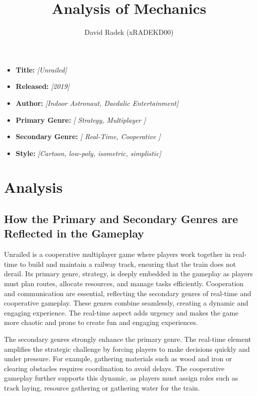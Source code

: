 \documentclass[a4paper,10pt,english]{article}
\title{%
Analysis of Mechanics%
}
\author{%
David Radek (xRADEKD00)%
}
\date{}
\newcommand{\ph}[1]{\textit{[#1]}}
\begin{document}
\maketitle
\thispagestyle{empty}

{%
\large

\begin{itemize}

\item[] \textbf{Title:} \ph{Unrailed}

\item[] \textbf{Released:} \ph{2019}

\item[] \textbf{Author:} \ph{Indoor Astronaut,  Daedalic Entertainment}

\item[] \textbf{Primary Genre:} \ph{ Strategy, Multiplayer  }

\item[] \textbf{Secondary Genre:} \ph{ Real-Time, Cooperative  }

\item[] \textbf{Style:} \ph{Cartoon, low-poly, isometric, simplistic}

\end{itemize}

}

\section*{\centering Analysis}

\subsection*{How the Primary and Secondary Genres are Reflected in the Gameplay}

Unrailed is a cooperative multiplayer game where players work together in real-time to build and maintain a railway track, ensuring that the train does not derail. Its primary genre, strategy, is deeply embedded in the gameplay as players must plan routes, allocate resources, and manage tasks efficiently. Cooperation and communication are essential, reflecting the secondary genres of real-time and cooperative gameplay. These genres combine seamlessly, creating a dynamic and engaging experience. The real-time aspect adds urgency and makes the game more chaotic and prone to create fun and engaging experiences.

The secondary genres strongly enhance the primary genre. The real-time element amplifies the strategic challenge by forcing players to make decisions quickly and under pressure. For example, gathering materials such as wood and iron or clearing obstacles requires coordination to avoid delays. The cooperative gameplay further supports this dynamic, as players must assign roles such as track laying, resource gathering or gathering water for the train. 
\end{document}
